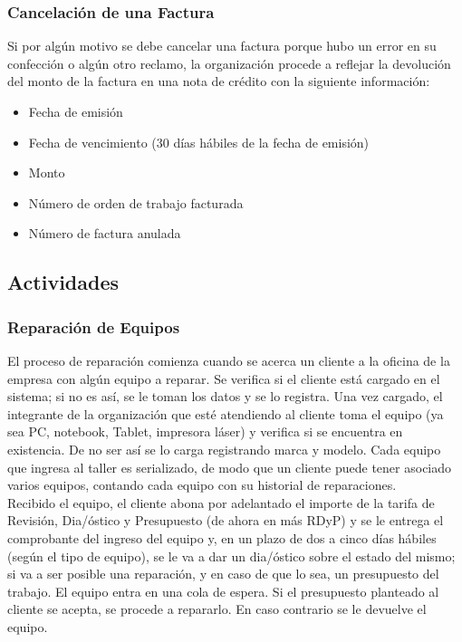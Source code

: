 \documentclass[12pt]{extarticle}
\begin{document}
\begin{spacing}{1.2}
    \subsubsection*{Cancelación de una Factura}
    Si por algún motivo se debe cancelar una factura porque hubo un error en su confección o algún otro reclamo, la organización procede a reflejar la devolución del monto de la factura en una nota de crédito con la siguiente información: \\
    \begin{itemize}
        \item Fecha de emisión
        \item Fecha de vencimiento (30 días hábiles de la fecha de emisión)
        \item Monto
        \item Número de orden de trabajo facturada
        \item Número de factura anulada
    \end{itemize}

    \pagebreak
    \subsection{Actividades}

    \subsubsection{Reparación de Equipos}
    El proceso de reparación comienza cuando se acerca un cliente a la oficina de la empresa con algún equipo a reparar. Se verifica si el cliente está cargado en el sistema; si no es así, se le toman los datos y se lo registra. Una vez cargado, el integrante de la organización que esté atendiendo al cliente toma el equipo (ya sea PC, notebook, Tablet, impresora láser) y verifica si se encuentra en existencia. De no ser así se lo carga registrando marca y modelo. Cada equipo que ingresa al taller es serializado, de modo que un cliente puede tener asociado varios equipos, contando cada equipo con su historial de reparaciones.\\

    Recibido el equipo, el cliente abona por adelantado el importe de la tarifa de Revisión, Dia/óstico y Presupuesto (de ahora en más RDyP) y se le entrega el comprobante del ingreso del equipo y, en un plazo de dos a cinco días hábiles (según el tipo de equipo), se le va a dar un dia/óstico sobre el estado del mismo; si va a ser posible una reparación, y en caso de que lo sea, un presupuesto del trabajo. El equipo entra en una cola de espera. Si el presupuesto planteado al cliente se acepta, se procede a repararlo. En caso contrario se le devuelve el equipo.\\


\end{spacing}
\end{document}
